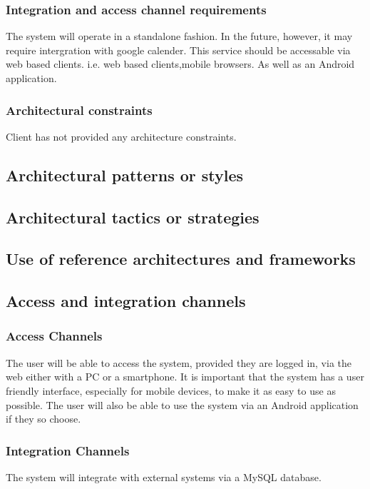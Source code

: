 \documentclass{article}
\begin{document}
			\subsubsection{Integration and access channel requirements}
				The system will operate in a standalone fashion. In the future, however, it may require intergration with google calender.
				This service should be accessable via web based clients. i.e. web based clients,mobile browsers. As well as an Android application.

			\subsubsection{Architectural constraints}
				Client has not provided any architecture constraints.

		\subsection{Architectural patterns or styles}

		\subsection{Architectural tactics or strategies}

		\subsection{Use of reference architectures and frameworks}

		\subsection{Access and integration channels}
			\subsubsection{Access Channels}
				The user will be able to access the system, provided they are logged in, via the web either with a PC or a smartphone.
				It is important that the system has a user friendly interface, especially for mobile devices, to make it as easy to use as possible.
				The user will also be able to use the system via an Android application if they so choose.
			\subsubsection{Integration Channels}
				The system will integrate with external systems via a MySQL database.
\end{document}
